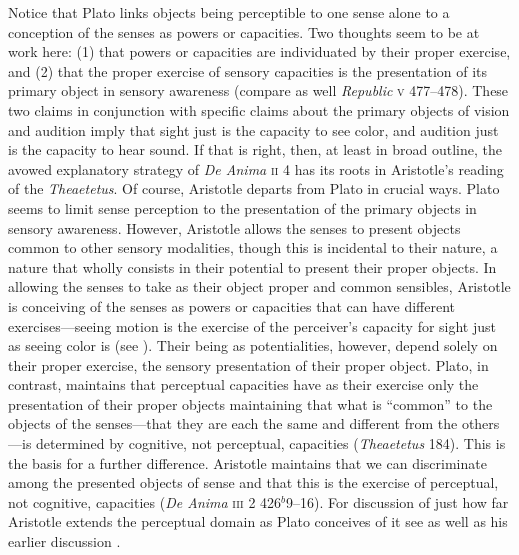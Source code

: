 Notice that Plato links objects being perceptible to one sense alone to a conception of the senses as powers or capacities. Two thoughts seem to be at work here: (1) that powers or capacities are individuated by their proper exercise, and (2) that the proper exercise of sensory capacities is the presentation of its primary object in sensory awareness (compare as well \emph{Republic} \textsc{v} 477--478). These two claims in conjunction with specific claims about the primary objects of vision and audition imply that sight just is the capacity to see color, and audition just is the capacity to hear sound. If that is right, then, at least in broad outline, the avowed explanatory strategy of \emph{De Anima} \textsc{ii} 4 has its roots in Aristotle's reading of the \emph{Theaetetus}. Of course, Aristotle departs from Plato in crucial ways. Plato seems to limit sense perception to the presentation of the primary objects in sensory awareness. However, Aristotle allows the senses to present objects common to other sensory modalities, though this is incidental to their nature, a nature that wholly consists in their potential to present their proper objects. In allowing the senses to take as their object proper and common sensibles, Aristotle is conceiving of the senses as powers or capacities that can have different exercises---seeing motion is the exercise of the perceiver's capacity for sight just as seeing color is (see \citealt{Freeland:1986fp}). Their being as potentialities, however, depend solely on their proper exercise, the sensory presentation of their proper object. Plato, in contrast, maintains that perceptual capacities have as their exercise only the presentation of their proper objects maintaining that what is ``common'' to the objects of the senses---that they are each the same and different from the others---is determined by cognitive, not perceptual, capacities (\emph{Theaetetus} 184). This is the basis for a further difference. Aristotle maintains that we can discriminate among the presented objects of sense and that this is the exercise of perceptual, not cognitive, capacities (\emph{De Anima} \textsc{iii} 2 426\( ^{b} \)9--16). For discussion of just how far Aristotle extends the perceptual domain as Plato conceives of it see \citealt{Sorabji:2003fk} as well as his earlier discussion \citealt{Sorabji:1971fr}.

